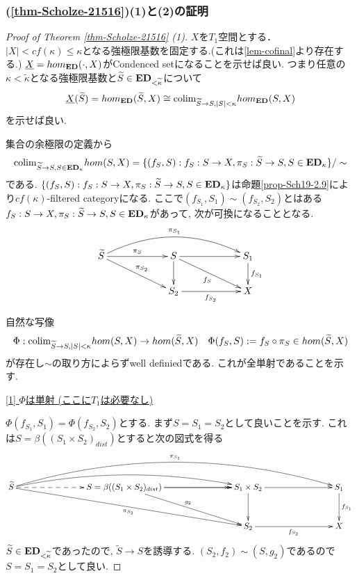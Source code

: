 \documentclass[dvipdfmx,a4paper,11pt]{article}
\newcommand{\colim}{{\rm colim}}
\theoremstyle{definition}
\begin{document}
\subsubsection{\cite[Proposition 2.15, Theorem 2.16]{Sch19}(\ref{thm-Scholze-21516})(1)と(2)の証明}

\begin{proof}[Proof of Theorem \ref{thm-Scholze-21516} (1)]
$X$を$T_1$空間とする． 
$|X| < cf(\kappa) \le \kappa$となる強極限基数を固定する.(これは\ref{lem-cofinal}より存在する.)
$\underline{X} = hom_{{\bf ED}}(\cdot, X)$がCondenced setになることを示せば良い.
つまり任意の$\kappa<\widetilde{\kappa}$となる強極限基数と$\widetilde{S} \in {\bf ED}_{< \widetilde{\kappa}}$について
$$
\underline{X}(\widetilde{S})=hom_{{\bf ED}}(\widetilde{S}, X)
\cong
\colim_{\widetilde{S} \to S, |S|<\kappa}hom_{{\bf ED}}(S,X)
$$
を示せば良い.

集合の余極限の定義から
$$
\colim_{\widetilde{S} \to S, S \in {\bf ED}_{\kappa}}hom(S,X)
=
\{ (f_{S}, S) : f_S : S \to X, \pi_{S}: \widetilde{S} \to S, S \in {\bf ED}_{\kappa}\}/\sim
$$
である.
$\{ (f_{S}, S) : f_S : S \to X, \pi_{S}: \widetilde{S} \to S, S \in {\bf ED}_{\kappa}\}
$は命題\ref{prop-Sch19-2.9}により$cf(\kappa)$-filtered categoryになる. 
ここで$(f_{S_1}, S_1) \sim (f_{S_2}, S_2)$とはある$f_S : S \to X, \pi_{S}: \widetilde{S} \to S, S \in {\bf ED}_{\kappa}$があって, 次が可換になることとなる.
\begin{equation*}
\xymatrix@C=60pt@R=20pt{
\widetilde{S}\ar@{->}[r]^{\pi_S} \ar@/^20pt/[rr]^{\pi_{S_{1}}}\ar@{->}[rd]^{\pi_{S_2}}
&S\ar@{->}[d]  \ar@{->}[r] \ar@{->}[rd]_{f_S}
& S_1\ar@{->}[d]^{f_{S_1}}
\\
&S_2 \ar@{->}[r]_{f_{S_2}} 
&X
 \\   
}
\end{equation*}

自然な写像
\begin{equation}
\Phi : \colim_{\widetilde{S} \to S, |S|<\kappa}hom(S,X)
\to hom(\widetilde{S}, X)
\quad
\Phi(f_{S}, S):=  f_S \circ \pi_S \in hom(\widetilde{S}, X)
\end{equation}
が存在し$\sim$の取り方によらずwell definiedである.
これが全単射であることを示す.

\underline{[1] $\Phi$は単射 (ここに$T_1$は必要なし) }

$\Phi(f_{S_1}, S_1) = \Phi(f_{S_2}, S_2)$とする.
まず$S=S_1=S_2$として良いことを示す. 
これは$S = \beta((S_1 \times S_2)_{dist})$とすると次の図式を得る
\begin{equation*}
\xymatrix@C=80pt@R=30pt{
\widetilde{S}\ar@{-->}[r] \ar@/^30pt/[rrr]^{\pi_{S_{1}}}
\ar@/^15pt/[rr]\ar@{->}[rrd]_{\pi_{S_2}}
& S=\beta((S_1 \times S_2)_{dist})
\ar@{->}[r] \ar@{->>}[r]\ar@{->}[rd]^{g_2}
&S_1 \times S_2\ar@{->}[d]  \ar@{->}[r] 
& S_1\ar@{->}[d]^{f_{S_1}}
\\
&
&S_2 \ar@{->}[r]_{f_{S_2}} 
&X
 \\   
}
\end{equation*} 
$\widetilde{S} \in {\bf ED}_{< \widetilde{\kappa}}$であったので, 
$\widetilde{S} \to S$を誘導する.
$(S_2,f_2) \sim (S, g_2)$であるので$S=S_1=S_2$として良い.


\end{proof}
\end{document}

